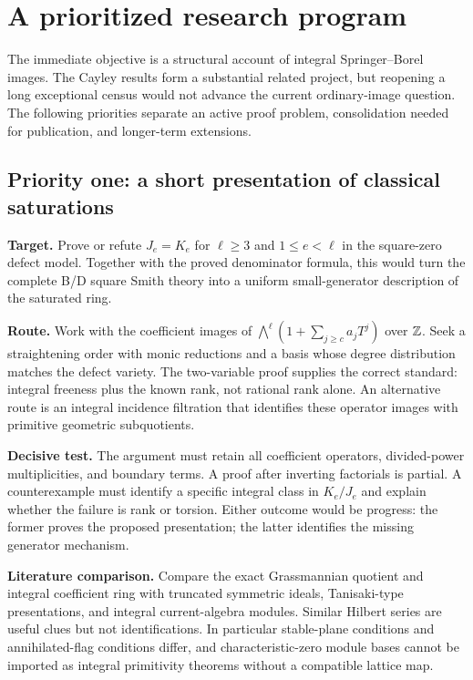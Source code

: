\section{A prioritized research program}
The immediate objective is a structural account of integral Springer--Borel images. The Cayley results form a substantial related project, but reopening a long exceptional census would not advance the current ordinary-image question. The following priorities separate an active proof problem, consolidation needed for publication, and longer-term extensions.

\subsection{Priority one: a short presentation of classical saturations}
\textbf{Target.} Prove or refute $J_e=K_e$ for $\ell\ge3$ and $1\le e<\ell$ in the square-zero defect model. Together with the proved denominator formula, this would turn the complete B/D square Smith theory into a uniform small-generator description of the saturated ring.

\textbf{Route.} Work with the coefficient images of $\bigwedge^\ell(1+\sum_{j\ge c}a_jT^j)$ over $\mathbb Z$. Seek a straightening order with monic reductions and a basis whose degree distribution matches the defect variety. The two-variable proof supplies the correct standard: integral freeness plus the known rank, not rational rank alone. An alternative route is an integral incidence filtration that identifies these operator images with primitive geometric subquotients.

\textbf{Decisive test.} The argument must retain all coefficient operators, divided-power multiplicities, and boundary terms. A proof after inverting factorials is partial. A counterexample must identify a specific integral class in $K_e/J_e$ and explain whether the failure is rank or torsion. Either outcome would be progress: the former proves the proposed presentation; the latter identifies the missing generator mechanism.

\textbf{Literature comparison.} Compare the exact Grassmannian quotient and integral coefficient ring with truncated symmetric ideals, Tanisaki-type presentations, and integral current-algebra modules. Similar Hilbert series are useful clues but not identifications. In particular stable-plane conditions and annihilated-flag conditions differ, and characteristic-zero module bases cannot be imported as integral primitivity theorems without a compatible lattice map.

